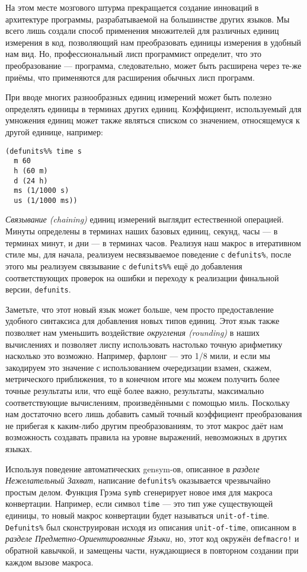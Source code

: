 На этом месте мозгового штурма прекращается создание инноваций в архитектуре программы, разрабатываемой на большинстве других языков. Мы всего лишь создали способ применения множителей для различных единиц измерения в код, позволяющий нам преобразовать единицы измерения в удобный нам вид. Но, профессиональный лисп программист определит, что это преобразование --- программа, следовательно, может быть расширена через те-же приёмы, что применяются для расширения обычных лисп программ.

При вводе многих разнообразных единиц измерений может быть полезно определять единицы в терминах других единиц. Коэффициент, используемый для умножения единиц может также являться списком со значением, относящемуся к другой единице, например:

\begin{verbatim}
(defunits%% time s
  m 60
  h (60 m)
  d (24 h)
  ms (1/1000 s)
  us (1/1000 ms))
\end{verbatim}

\emph{Связывание (chaining)} единиц измерений выглядит естественной операцией. Минуты определены в терминах наших базовых единиц, секунд, часы --- в терминах минут, и дни --- в терминах часов. Реализуя наш макрос в итеративном стиле мы, для начала, реализуем несвязываемое поведение с \verb"defunits%", после этого мы реализуем связывание с \verb"defunits%%" ещё до добавления соответствующих проверок на ошибки и переходу к реализации финальной версии, \verb"defunits".

Заметьте, что этот новый язык может больше, чем просто предоставление удобного синтаксиса для добавления новых типов единиц. Этот язык также позволяет нам уменьшить воздействие \emph{округления (rounding)} в наших вычислениях и позволяет лиспу использовать настолько точную арифметику насколько это возможно. Например, фарлонг --- это 1/8 мили, и если мы закодируем это значение с использованием очередизации взамен, скажем, метрического приближения, то в конечном итоге мы можем получить более точные результаты или, что ещё более важно, результаты, максимально соответствующие вычислениям, произведёнными с помощью миль. Поскольку нам достаточно всего лишь добавить самый точный коэффициент преобразования не прибегая к каким-либо другим преобразованиям, то этот макрос даёт нам возможность создавать правила на уровне выражений, невозможных в других языках.

Используя поведение автоматических gensym-ов, описанное в \emph{разделе Нежелательный Захват}, написание \verb"defunits%" оказывается чрезвычайно простым делом. Функция Грэма \verb"symb" сгенерирует новое имя для макроса конвертации. Например, если символ \verb"time" --- это тип уже существующей единицы, то новый макрос конвертации будет называться \verb"unit-of-time". \verb"Defunits%" был сконструирован исходя из описания \verb"unit-of-time", описанном в \emph{разделе Предметно-Ориентированные Языки}, но, этот код окружён \verb"defmacro!" и обратной кавычкой, и замещены части, нуждающиеся в повторном создании при каждом вызове макроса.


